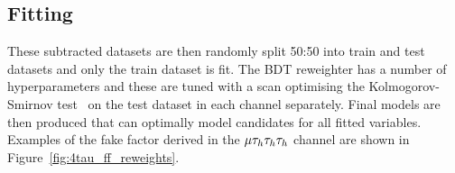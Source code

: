\subsection{Fitting}

These subtracted datasets are then randomly split 50:50 into train and test datasets and only the train dataset is fit. 
The \ac{BDT} reweighter has a number of hyperparameters and these are tuned with a scan optimising the Kolmogorov-Smirnov test~\cite{16e7f618-c06b-3d10-8705-1086b218d827} on the test dataset in each channel separately.
Final models are then produced that can optimally model \jtth candidates for all fitted variables. 
Examples of the fake factor derived in the $\mu\tau_{h}\tau_{h}\tau_{h}$ channel are shown in Figure~\ref{fig:4tau_ff_reweights}. \\

